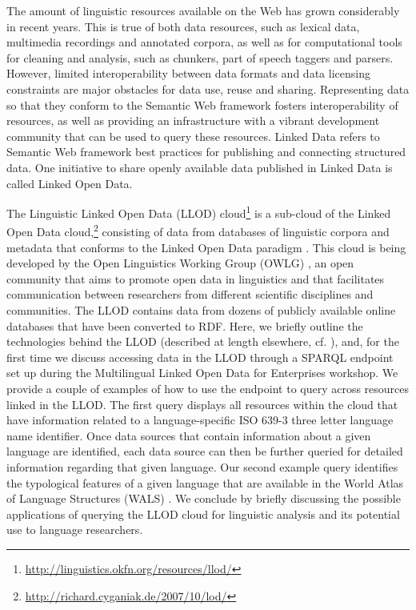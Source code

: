The amount of linguistic resources available on the Web has grown considerably in recent years. This is true of both data resources, such as lexical data, multimedia recordings and annotated corpora, as well as for computational tools for cleaning and analysis, such as chunkers, part of speech taggers and parsers. However, limited interoperability between data formats and data licensing constraints are major obstacles for data use, reuse and sharing. Representing data so that they conform to the Semantic Web framework fosters interoperability of resources, as well as providing an infrastructure with a vibrant development community that can be used to query these resources. Linked Data refers to Semantic Web framework best practices for publishing and connecting structured data. One initiative to share openly available data published in Linked Data is called Linked Open Data.

The Linguistic Linked Open Data (LLOD) cloud\footnote{\url{http://linguistics.okfn.org/resources/llod/}} is a sub-cloud of the Linked Open Data cloud,\footnote{\url{http://richard.cyganiak.de/2007/10/lod/}} consisting of data from databases of linguistic corpora and metadata that conforms to the Linked Open Data paradigm \citep{bernersLee2006_linkeddata}. This cloud is being developed by the Open Linguistics Working Group (OWLG) \cite{owlg4lrec}, an open community that aims to promote open data in linguistics and that facilitates communication between researchers from different scientific disciplines and communities. The LLOD  contains data from dozens of publicly available online databases that have been converted to RDF. Here, we briefly outline the technologies behind the LLOD (described at length elsewhere, cf. \cite{ldl-llod, ChiarcosLOD}), and, for the first time we discuss accessing data in the LLOD through a SPARQL endpoint set up during the Multilingual Linked Open Data for Enterprises workshop. We provide a couple of examples of how to use the endpoint to query across resources linked in the LLOD. The first query displays all resources within the cloud that have information related to a language-specific ISO 639-3 three letter language name identifier. Once data sources that contain information about a given language are identified, each data source can then be further queried for detailed information regarding that given language. Our second example query identifies the typological features of a given language that are available in the World Atlas of Language Structures (WALS) \citep{Haspelmath_etal2008}. We conclude by briefly discussing the possible applications of querying the LLOD cloud for linguistic analysis and its potential use to language researchers. 
